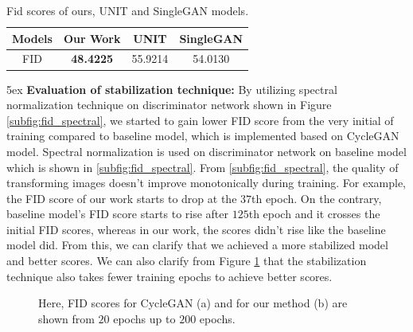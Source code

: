 \documentclass[runningheads]{llncs}
\begin{document}
\begin{table}[!htb]
\centering
\caption{Fid scores of ours, UNIT and SingleGAN models.}
\large\addtolength{\tabcolsep}{0pt}
\begin{tabular}{ |c|c|c|c| } 
 \hline
 Models & Our Work & UNIT & SingleGAN \\ 
 \hline
 FID & \textbf{48.4225} & 55.9214 & 54.0130 \\
 \hline  
\end{tabular}
\label{fid_table}
\end{table}


\parindent 5ex \textbf{Evaluation of stabilization technique:}
By utilizing spectral normalization technique on discriminator network shown in Figure \ref{subfig:fid_spectral}, we started to gain lower FID score from the very initial of training compared to baseline model, which is implemented based on CycleGAN\cite{DBLP:conf/iccv/ZhuPIE17} model. Spectral normalization is used on discriminator network on baseline model which is shown in \ref{subfig:fid_spectral}. From \ref{subfig:fid_spectral}, the quality of transforming images doesn't improve monotonically during training. For example, the FID score of our work starts to drop at the $37$th epoch. On the contrary, baseline model's FID score starts to rise after $125$th epoch and it crosses the initial FID scores, whereas in our work, the scores didn't rise like the baseline model did. From this, we can clarify that we achieved a more stabilized model and better scores. We can also clarify from Figure \ref{fig:fid_graph} that the stabilization technique also takes fewer training epochs to achieve better scores. %

\begin{figure}
\centering     %
{}
\caption{Here, FID scores for CycleGAN (a) and for our method (b) are shown from $20$ epochs up to $200$ epochs.}
\label{fig:fid_graph}
\end{figure}
\end{document}

